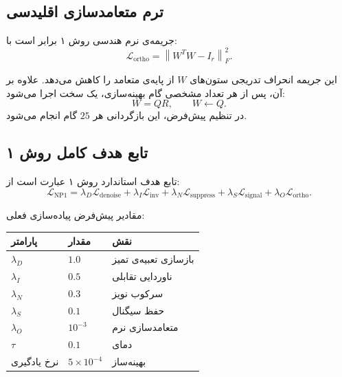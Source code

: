 \documentclass[a4paper,12pt]{article}
\newcommand{\EN}[1]{\lr{#1}}
\newcommand{\InfoNCE}{\lr{InfoNCE}}
\newcommand{\QR}{\lr{QR}}
\begin{document}
\subsection{ترم متعامدسازی اقلیدسی}

جریمه‌ی نرم هندسی روش ۱ برابر است با:
\begin{equation}
 \mathcal{L}_{\mathrm{ortho}}
 =
 \left\|W^{T}W-I_r\right\|_{F}^{2}.
\end{equation}

این جریمه انحراف تدریجی ستون‌های $W$ از پایه‌ی متعامد را کاهش می‌دهد. علاوه بر آن، پس از هر تعداد مشخصی گام بهینه‌سازی، یک \QR{} سخت اجرا می‌شود:
\begin{equation}
 W=QR,
 \qquad
 W\leftarrow Q.
\end{equation}
در تنظیم پیش‌فرض، این بازگردانی هر $25$ گام انجام می‌شود.

\subsection{تابع هدف کامل روش ۱}

تابع هدف استاندارد روش ۱ عبارت است از:
\begin{equation}
 \mathcal{L}_{\mathrm{NP1}}
 =
 \lambda_D\mathcal{L}_{\mathrm{denoise}}
 +
 \lambda_I\mathcal{L}_{\mathrm{inv}}
 +
 \lambda_N\mathcal{L}_{\mathrm{suppress}}
 +
 \lambda_S\mathcal{L}_{\mathrm{signal}}
 +
 \lambda_O\mathcal{L}_{\mathrm{ortho}}.
\end{equation}

مقادیر پیش‌فرض پیاده‌سازی فعلی:
\begin{center}
\begin{tabular}{|C{4.1cm}|C{3cm}|C{4.5cm}|}
\hline
\textbf{پارامتر} & \textbf{مقدار} & \textbf{نقش} \\
\hline
$\lambda_D$ & $1.0$ & بازسازی تعبیه‌ی تمیز \\
\hline
$\lambda_I$ & $0.5$ & ناوردایی تقابلی \\
\hline
$\lambda_N$ & $0.3$ & سرکوب نویز \\
\hline
$\lambda_S$ & $0.1$ & حفظ سیگنال \\
\hline
$\lambda_O$ & $10^{-3}$ & متعامدسازی نرم \\
\hline
$\tau$ & $0.1$ & دمای \InfoNCE{} \\
\hline
نرخ یادگیری & $5\times10^{-4}$ & بهینه‌ساز \EN{Adam} \\
\hline
\end{tabular}
\end{center}
\end{document}

